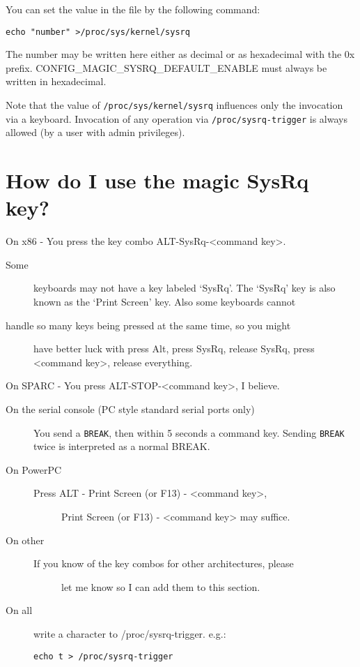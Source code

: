 \documentclass[article,letterpaper]{memoir}
\let\subsection\section
\let\section\chapter
\begin{document}
You can set the value in the file by the following command:

\begin{verbatim}
echo "number" >/proc/sys/kernel/sysrq
\end{verbatim}

The number may be written here either as decimal or as hexadecimal with
the 0x prefix. CONFIG\_MAGIC\_SYSRQ\_DEFAULT\_ENABLE must always be
written in hexadecimal.

Note that the value of \texttt{/proc/sys/kernel/sysrq} influences only
the invocation via a keyboard. Invocation of any operation via
\texttt{/proc/sysrq-trigger} is always allowed (by a user with admin
privileges).

\subsection{How do I use the magic SysRq
key?}\label{how-do-i-use-the-magic-sysrq-key}

On x86 - You press the key combo
ALT-SysRq-\textless{}command key\textgreater{}.

\begin{description}
\item[Some]
keyboards may not have a key labeled `SysRq'. The `SysRq' key is also
known as the `Print Screen' key. Also some keyboards cannot
\item[handle so many keys being pressed at the same time, so you might]
have better luck with press Alt, press SysRq, release SysRq, press
\textless{}command key\textgreater{}, release everything.
\end{description}

On SPARC - You press ALT-STOP-\textless{}command key\textgreater{}, I
believe.

\begin{description}
\item[On the serial console (PC style standard serial ports only)]
You send a \texttt{BREAK}, then within 5 seconds a command key. Sending
\texttt{BREAK} twice is interpreted as a normal BREAK.
\item[On PowerPC]
\begin{description}
\item[Press ALT - Print Screen (or F13) -
\textless{}command key\textgreater{},]
Print Screen (or F13) - \textless{}command key\textgreater{} may
suffice.
\end{description}
\item[On other]
\begin{description}
\item[If you know of the key combos for other architectures, please]
let me know so I can add them to this section.
\end{description}
\item[On all]
write a character to /proc/sysrq-trigger. e.g.:

\begin{verbatim}
echo t > /proc/sysrq-trigger
\end{verbatim}
\end{description}
\end{document}
